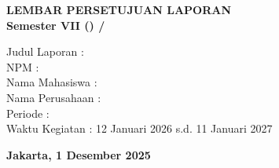 \begin{center}
    \bfseries{LEMBAR PERSETUJUAN LAPORAN\\
    Semester VII (\semester) / {\academicperiod}}
\end{center}

Judul Laporan   \tab : {\@title}\\
NPM \tab : {\authornim}\\
Nama Mahasiswa \tab : {\authorname}\\
Nama Perusahaan \tab : {\company}\\
Periode {\jenisMBKM} \tab : {\lamaMBKM}\\
Waktu Kegiatan \tab : 12 Januari 2026 s.d. 11 Januari 2027

\begin{flushright}
    \textbf{Jakarta, 1 Desember 2025}
\end{flushright}